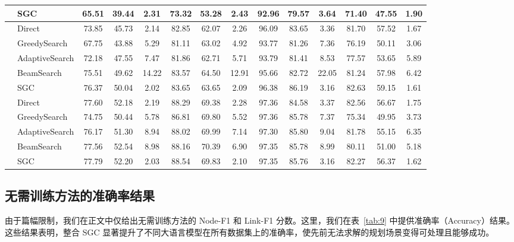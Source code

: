 \documentclass[11pt,UTF8,fontset=fandol]{ctexart}
\begin{document}
\begin{table}[H]
\begin{tabular}{llccc ccc ccc ccc}
& SGC & 65.51 & 39.44 & 2.31 & 73.32 & 53.28 & 2.43 & 92.96 & 79.57 & 3.64 & 71.40 & 47.55 & 1.90\\
\midrule
{}
& Direct & 73.85 & 45.73 & 2.14 & 82.85 & 62.07 & 2.26 & 96.09 & 83.65 & 3.36 & 81.70 & 57.52 & 1.67\\
& GreedySearch & 67.75 & 43.88 & 5.29 & 81.11 & 63.02 & 4.92 & 93.77 & 81.26 & 7.36 & 76.19 & 50.11 & 3.06\\
& AdaptiveSearch & 72.18 & 47.55 & 7.47 & 81.86 & 62.71 & 5.71 & 93.79 & 81.41 & 8.53 & 77.57 & 53.65 & 5.89\\
& BeamSearch & 75.51 & 49.62 & 14.22 & 83.57 & 64.50 & 12.91 & 95.66 & 82.72 & 22.05 & 81.24 & 57.98 & 6.42\\
& SGC & 76.37 & 50.04 & 2.02 & 83.65 & 63.65 & 2.09 & 96.38 & 86.19 & 3.16 & 82.63 & 59.15 & 1.61\\
\midrule
{}
& Direct & 77.60 & 52.18 & 2.19 & 88.29 & 69.38 & 2.28 & 97.36 & 84.58 & 3.37 & 82.56 & 56.67 & 1.75\\
& GreedySearch & 74.75 & 50.44 & 5.78 & 86.81 & 69.80 & 5.52 & 97.36 & 85.78 & 7.37 & 75.34 & 49.95 & 3.73\\
& AdaptiveSearch & 76.17 & 51.30 & 8.94 & 88.02 & 69.99 & 7.14 & 97.30 & 85.80 & 9.04 & 81.78 & 55.15 & 6.35\\
& BeamSearch & 77.56 & 52.54 & 8.98 & 88.16 & 70.39 & 6.90 & 97.35 & 85.78 & 8.99 & 80.11 & 51.00 & 5.18\\
& SGC & 77.79 & 52.20 & 2.03 & 88.54 & 69.83 & 2.10 & 97.35 & 85.76 & 3.16 & 82.27 & 56.37 & 1.62\\
\bottomrule
\end{tabular}
\end{table}

\subsection{无需训练方法的准确率结果}

由于篇幅限制，我们在正文中仅给出无需训练方法的 Node-F1 和 Link-F1 分数。这里，我们在表~\ref{tab:9} 中提供准确率（Accuracy）结果。这些结果表明，整合 SGC 显著提升了不同大语言模型在所有数据集上的准确率，使先前无法求解的规划场景变得可处理且能够成功。
\end{document}
